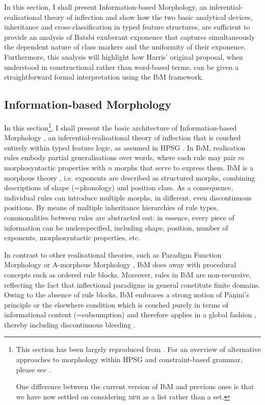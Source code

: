 \documentclass[output=paper]{langsci/langscibook}
\begin{document}
In this section, I shall present Information-based Morphology, an
inferential-realisational theory of inflection and show how the two
basic analytical devices, inheritance and cross-classification in
typed feature structures, are sufficient to provide an analysis of
Batsbi exuberant exponence that captures simultaneously the dependent
nature of class markers and the uniformity of their
exponence. Furthermore, this analysis will highlight how Harris'
original proposal, when understood in constructional rather than
word-based terms, can be given a straightforward formal interpretation
using the IbM framework.



\subsection{Information-based Morphology}
\label{sec:IbM}

In this section\footnote{This section has been largely reproduced from
  \citet{Crysmann:Bonami:2017:HPSG}. For an overview of alternative
  approaches to morphology within HPSG and constraint-based grammar,
  please see \citet{Bonami15b}.

  One difference between the current version of IbM and previous ones
  is that we have now settled on considering \textsc{mph} as a list rather
  than a set.}, I shall present the basic architecture of
Information-based Morphology
\citep[IbM, ][]{Crysmann:Bonami:2016,Crysmann:14:OUP}, an
inferential-realisa\-tional theory of inflection \citep[cf.][]{Stump01}
that is couched entirely within typed feature logic, as assumed in
HPSG \citep{Pollard87,Pollard94}. In IbM, realisation rules embody
partial generalisations over words, where each rule may pair $m$
morphosyntactic properties with $n$ morphs that serve to express them.
IbM is a morphous theory \citep{Crysmann:Bonami:2016}, i.e. exponents
are described as structured morphs, combining descriptions of shape
(=phonology) and position class. As a consequence, individual rules
can introduce multiple morphs, in different, even discontinuous
positions. By means of multiple inheritance hierarchies of rule types,
commonalities between rules are abstracted out: in essence, every
piece of information can be underspecified, including shape, position,
number of exponents, morphosyntactic properties, etc.

In contrast to other realisational theories, such as Paradigm Function
Morphology \citep{Stump01} or A-morphous Morphology
\citep{Anderson92}, IbM does away with procedural concepts such as
ordered rule blocks. Moreover, rules in IbM are non-recursive,
reflecting the fact that inflectional paradigms in general constitute
finite domains.  Owing to the absence of rule blocks, IbM embraces a
strong notion of Pāṇini's principle or the elsewhere condition
\citep{kiparsky_p85} which is couched purely in terms of informational
content (=subsumption) and therefore applies in a global fashion
\citep{Crysmann:14:OUP}, thereby including discontinuous bleeding
\citep{Noyer92}.
\end{document}
